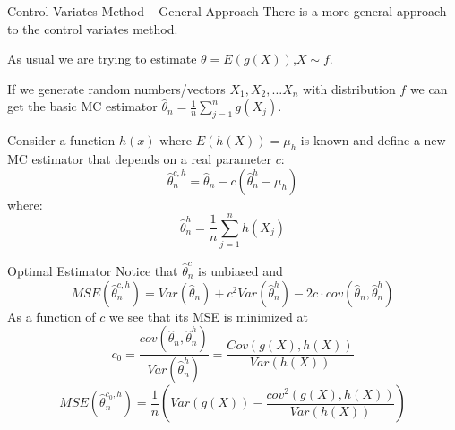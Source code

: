 \documentclass[8pt]{beamer}
\begin{document}
\begin{frame}{Control Variates Method -- General Approach}
There is a more general approach to the control variates method.

\vspace{2mm}
 
As usual we are trying to estimate  $\theta=E(g(X))$,$ X \sim f$.

\vspace{2mm}

If we generate random numbers/vectors $X_1,X_2,\ldots X_n$ with distribution $f$ we can get the basic MC estimator $\hat{\theta}_n=\frac{1}{n}\sum_{j=1}^n g(X_j)$.

\vspace{2mm}

Consider a function $h(x)$ where $E(h(X))=\mu_h$ is known and define a new MC estimator that depends on a real parameter $c$:
\begin{equation*}
    \hat{\theta}_n^{c,h}=\hat{\theta}_n - c(\hat{\theta}^{h}_n-\mu_h)
\end{equation*}
where:
\begin{equation*}
    \hat{\theta}^{h}_n=\frac{1}{n} \sum_{j=1}^n h(X_j)
\end{equation*}
\end{frame}

\begin{frame}{Optimal Estimator}
Notice that $ \hat{\theta}_n^c$ is unbiased and
\begin{equation*}
     MSE(\hat{\theta}_n^{c,h})=Var( \hat{\theta}_n)+c^2 Var( \hat{\theta}^{h}_n)-2 c \cdot cov(\hat{\theta}_n,\hat{\theta}^{h}_n)
\end{equation*}
As a function of $c$ we see that its MSE is minimized at
\begin{equation*}
    c_0=\frac{cov(\hat{\theta}_n,\hat{\theta}^{h}_n)}{Var( \hat{\theta}^{h}_n)}=\frac{Cov(g(X),h(X))}{Var(h(X))}
\end{equation*}
\begin{equation*}
     MSE\left(\hat{\theta}_n^{c_0,h}\right)=\frac{1}{n}\left(Var(g(X))-\frac{cov^2(g(X),h(X))}{Var(h(X))}\right)
\end{equation*}
\end{frame}
\end{document}
